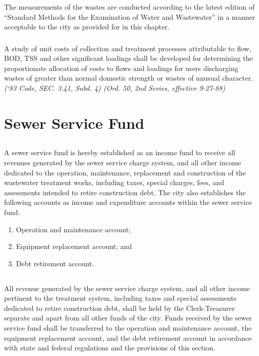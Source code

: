\documentclass[code.tex]{subfiles}
\begin{document}
\subsubsection{}
The measurements of the wastes are conducted according to the latest edition of “Standard Methods for the Examination of Water and Wastewater” in a manner acceptable to the city as provided for in this chapter.
\subsubsection{}
A study of unit costs of collection and treatment processes attributable to flow, BOD, TSS and other significant loadings shall be developed for determining the proportionate allocation of costs to flows and loadings for users discharging wastes of greater than normal domestic strength or wastes of unusual character.\newline
\emph{(‘83 Code, SEC. 3.41, Subd. 4) (Ord. 50, 2nd Series, effective 9-27-88)}
\section{Sewer Service Fund}
\subsection{}
A sewer service fund is hereby established as an income fund to receive all revenues generated by the sewer service charge system, and all other income dedicated to the operation, maintenance, replacement and construction of the wastewater treatment works, including taxes, special charges, fees, and assessments intended to retire construction debt.  The city also establishes the following accounts as income and expenditure accounts within the sewer service fund:
\begin{enumerate}
\item Operation and maintenance account;
\item Equipment replacement account; and
\item Debt retirement account.
\end{enumerate}
\subsection{}
All revenue generated by the sewer service charge system, and all other income pertinent to the treatment system, including taxes and special assessments dedicated to retire construction debt, shall be held by the Clerk-Treasurer separate and apart from all other funds of the city.  Funds received by the sewer service fund shall be transferred to the operation and maintenance account, the equipment replacement account, and the debt retirement account in accordance with state and federal regulations and the provisions of this section.
\end{document}
